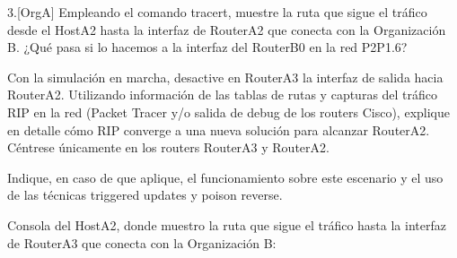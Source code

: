 \begin{ejer}
3.[OrgA] Empleando el comando tracert, muestre la ruta que sigue el tráfico desde el HostA2 hasta la interfaz de RouterA2 que conecta con la Organización B. ¿Qué pasa si lo hacemos a la interfaz del RouterB0 en la red P2P1.6?
\par Con la simulación en marcha, desactive en RouterA3 la interfaz de salida hacia RouterA2. Utilizando información de las tablas de rutas y capturas del tráfico RIP en la red (Packet Tracer y/o salida de debug de los routers Cisco), explique en detalle cómo RIP converge a una nueva solución para alcanzar RouterA2. Céntrese únicamente en los routers RouterA3 y RouterA2.
\par Indique, en caso de que aplique, el funcionamiento sobre este escenario y el uso de las técnicas triggered updates y poison reverse. \\
\end{ejer}

\par Consola del HostA2, donde muestro la ruta que sigue el tráfico hasta la interfaz de RouterA3 que conecta con la Organización B: 


